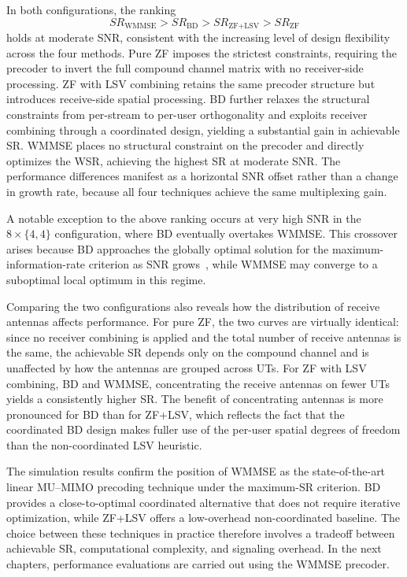In both configurations, the ranking
$$
SR_{\text{WMMSE}} > SR_{\text{BD}} > SR_{\text{ZF}+\text{LSV}} > SR_{\text{ZF}} 
$$
holds at moderate \ac{SNR}, consistent with the increasing level of design flexibility across the four methods.
Pure \ac{ZF} imposes the strictest constraints, requiring the precoder to invert the full compound channel matrix with no receiver-side processing.
\ac{ZF} with \ac{LSV} combining retains the same precoder structure but introduces receive-side spatial processing.
\ac{BD} further relaxes the structural constraints from per-stream to per-user orthogonality and exploits receiver combining through a coordinated design, yielding a substantial gain in achievable \ac{SR}.
\ac{WMMSE} places no structural constraint on the precoder and directly optimizes the \ac{WSR}, achieving the highest \ac{SR} at moderate \ac{SNR}.
The performance differences manifest as a horizontal \ac{SNR} offset rather than a change in growth rate, because all four techniques achieve the same multiplexing gain.

A notable exception to the above ranking occurs at very high \ac{SNR} in the $8 \times \{4,4\}$ configuration, where \ac{BD} eventually overtakes \ac{WMMSE}.
This crossover arises because \ac{BD} approaches the globally optimal solution for the maximum-information-rate criterion as \ac{SNR} grows~\cite{BD_precoding_0}, while \ac{WMMSE} may converge to a suboptimal local optimum in this regime.

Comparing the two configurations also reveals how the distribution of receive antennas affects performance.
For pure \ac{ZF}, the two curves are virtually identical: since no receiver combining is applied and the total number of receive antennas is the same, the achievable \ac{SR} depends only on the compound channel and is unaffected by how the antennas are grouped across \acp{UT}.
For \ac{ZF} with \ac{LSV} combining, \ac{BD} and \ac{WMMSE}, concentrating the receive antennas on fewer \acp{UT} yields a consistently higher \ac{SR}.
The benefit of concentrating antennas is more pronounced for \ac{BD} than for \ac{ZF}+\ac{LSV}, which reflects the fact that the coordinated \ac{BD} design makes fuller use of the per-user spatial degrees of freedom than the non-coordinated \ac{LSV} heuristic.

The simulation results confirm the position of \ac{WMMSE} as the state-of-the-art linear \ac{MU}--\ac{MIMO} precoding technique under the maximum-\ac{SR} criterion.
\ac{BD} provides a close-to-optimal coordinated alternative that does not require iterative optimization, while \ac{ZF}+\ac{LSV} offers a low-overhead non-coordinated baseline.
The choice between these techniques in practice therefore involves a tradeoff between achievable \ac{SR}, computational complexity, and signaling overhead.
In the next chapters, performance evaluations are carried out using the \ac{WMMSE} precoder.
